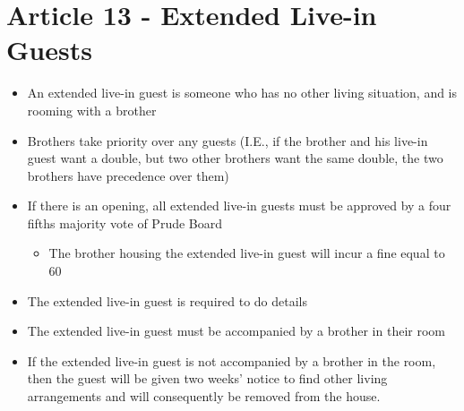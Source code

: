 \documentclass{article}
\begin{document}
\section*{Article 13 - Extended Live-in Guests}
\begin{itemize}
    \item An extended live-in guest is someone who has no other living situation, and is rooming with a brother
    \item Brothers take priority over any guests (I.E., if the brother and his live-in guest want a double, but two other brothers want the same double, the two brothers have precedence over them)
    \item If there is an opening, all extended live-in guests must be approved by a four fifths majority vote of Prude Board
    \begin{itemize}
        \item The brother housing the extended live-in guest will incur a fine equal to 60%
    \end{itemize}
    \item The extended live-in guest is required to do details
    \item The extended live-in guest must be accompanied by a brother in their room
    \item If the extended live-in guest is not accompanied by a brother in the room, then the guest will be given two weeks' notice to find other living arrangements and will consequently be removed from the house.
\end{itemize}
\end{document}

